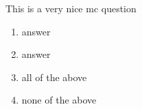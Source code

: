 \begin{multiplechoice}
    \item This is a very nice mc question
    \begin{enumerate}   
        \item answer  
        \item answer
        \item all of the above
        \item none of the above
    \end{enumerate}
    
\end{multiplechoice}                %